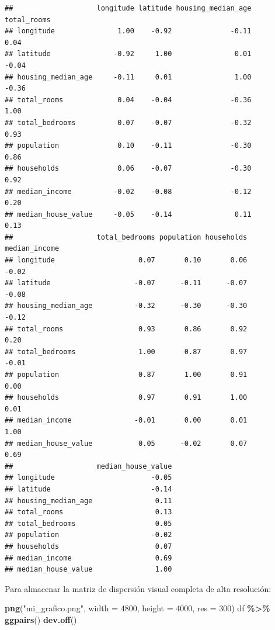 \documentclass[
]{book}
\newenvironment{Shaded}{\begin{snugshade}}{\end{snugshade}}
\newcommand{\AttributeTok}[1]{\textcolor[rgb]{0.13,0.29,0.53}{#1}}
\newcommand{\DecValTok}[1]{\textcolor[rgb]{0.00,0.00,0.81}{#1}}
\newcommand{\FunctionTok}[1]{\textcolor[rgb]{0.13,0.29,0.53}{\textbf{#1}}}
\newcommand{\NormalTok}[1]{#1}
\newcommand{\SpecialCharTok}[1]{\textcolor[rgb]{0.81,0.36,0.00}{\textbf{#1}}}
\newcommand{\StringTok}[1]{\textcolor[rgb]{0.31,0.60,0.02}{#1}}
\begin{document}
\begin{verbatim}
##                    longitude latitude housing_median_age total_rooms
## longitude               1.00    -0.92              -0.11        0.04
## latitude               -0.92     1.00               0.01       -0.04
## housing_median_age     -0.11     0.01               1.00       -0.36
## total_rooms             0.04    -0.04              -0.36        1.00
## total_bedrooms          0.07    -0.07              -0.32        0.93
## population              0.10    -0.11              -0.30        0.86
## households              0.06    -0.07              -0.30        0.92
## median_income          -0.02    -0.08              -0.12        0.20
## median_house_value     -0.05    -0.14               0.11        0.13
##                    total_bedrooms population households median_income
## longitude                    0.07       0.10       0.06         -0.02
## latitude                    -0.07      -0.11      -0.07         -0.08
## housing_median_age          -0.32      -0.30      -0.30         -0.12
## total_rooms                  0.93       0.86       0.92          0.20
## total_bedrooms               1.00       0.87       0.97         -0.01
## population                   0.87       1.00       0.91          0.00
## households                   0.97       0.91       1.00          0.01
## median_income               -0.01       0.00       0.01          1.00
## median_house_value           0.05      -0.02       0.07          0.69
##                    median_house_value
## longitude                       -0.05
## latitude                        -0.14
## housing_median_age               0.11
## total_rooms                      0.13
## total_bedrooms                   0.05
## population                      -0.02
## households                       0.07
## median_income                    0.69
## median_house_value               1.00
\end{verbatim}

Para almacenar la matriz de dispersión visual completa de alta resolución:

\begin{Shaded}
\begin{Highlighting}[]
\FunctionTok{png}\NormalTok{(}\StringTok{"mi\_grafico.png"}\NormalTok{, }\AttributeTok{width =} \DecValTok{4800}\NormalTok{, }\AttributeTok{height =} \DecValTok{4000}\NormalTok{, }\AttributeTok{res =} \DecValTok{300}\NormalTok{)}
\NormalTok{df }\SpecialCharTok{\%\textgreater{}\%} \FunctionTok{ggpairs}\NormalTok{()}
\FunctionTok{dev.off}\NormalTok{()}
\end{Highlighting}
\end{Shaded}
\end{document}
